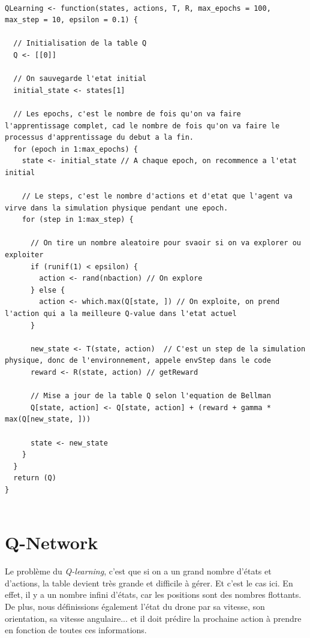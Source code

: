 \documentclass{article}
\begin{document}
\begin{lstlisting}[style=CStyle]
 
QLearning <- function(states, actions, T, R, max_epochs = 100, max_step = 10, epsilon = 0.1) {
  
  // Initialisation de la table Q
  Q <- [[0]]
  
  // On sauvegarde l'etat initial
  initial_state <- states[1]
  
  // Les epochs, c'est le nombre de fois qu'on va faire l'apprentissage complet, cad le nombre de fois qu'on va faire le processus d'apprentissage du debut a la fin.
  for (epoch in 1:max_epochs) {
    state <- initial_state // A chaque epoch, on recommence a l'etat initial
    
    // Le steps, c'est le nombre d'actions et d'etat que l'agent va virve dans la simulation physique pendant une epoch.
    for (step in 1:max_step) {
      
      // On tire un nombre aleatoire pour svaoir si on va explorer ou exploiter
      if (runif(1) < epsilon) {
        action <- rand(nbaction) // On explore
      } else {
        action <- which.max(Q[state, ]) // On exploite, on prend l'action qui a la meilleure Q-value dans l'etat actuel
      }
      
      new_state <- T(state, action)  // C'est un step de la simulation physique, donc de l'environnement, appele envStep dans le code
      reward <- R(state, action) // getReward
      
      // Mise a jour de la table Q selon l'equation de Bellman
      Q[state, action] <- Q[state, action] + (reward + gamma * max(Q[new_state, ]))
      
      state <- new_state
    }
  }
  return (Q)
}
   
\end{lstlisting}


\section{Q-Network}

Le problème du \textit{Q-learning}, c'est que si on a un grand nombre d'états et d'actions, la table devient très grande et difficile à gérer.
Et c'est le cas ici. En effet, il y a un nombre infini d'états, car les positions sont des nombres flottants. De plus, nous définissions également l'état du drone par sa vitesse,
son orientation, sa vitesse angulaire... et il doit prédire la prochaine action à prendre en fonction de toutes ces informations.
\end{document}

